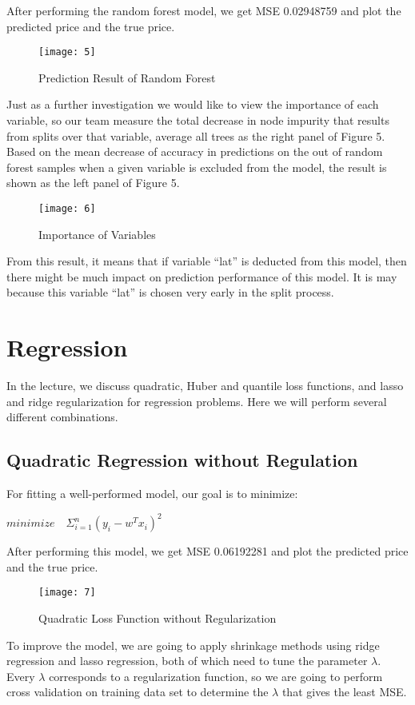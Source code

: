 \documentclass[12pt,twocolumn,twoside]{article}
\begin{document}
After performing the random forest model, we get MSE 0.02948759 and plot the predicted price and the true price.
\begin{figure}[h]
\texttt{[image: 5]}
\caption{Prediction Result of Random Forest}
\end{figure}
Just as a further investigation we would like to view the importance of each variable, so our team measure the total decrease in node impurity that results from splits over that variable, average all trees as the right panel of Figure 5. Based on the mean decrease of accuracy in predictions on the out of random forest samples when a given variable is excluded from the model, the result is shown as the left panel of Figure 5.
\begin{figure}[h]
\texttt{[image: 6]}
\caption{Importance of Variables}
\end{figure}
From this result, it means that if variable “lat” is deducted from this model, then there might be much impact on prediction performance of this model. It is may because this variable “lat” is chosen very early in the split process. 
\section{Regression}
In the lecture, we discuss quadratic, Huber and quantile loss functions, and lasso and ridge regularization for regression problems. Here we will perform several different combinations.

\subsection{Quadratic Regression without Regulation}
For fitting a well-performed model, our goal is to minimize:\\
\begin{center}
$minimize \quad \Sigma_{i=1}^n (y_i -w^T x_i)^2$
\end{center}
After performing this model, we get MSE 0.06192281
and plot the predicted price and the true price.
\begin{figure}[h]
\texttt{[image: 7]}
\caption{Quadratic Loss Function without Regularization}
\end{figure}
To improve the model, we are going to apply shrinkage methods using ridge regression and lasso regression, both of which need to tune the parameter $\lambda$. Every $\lambda$ corresponds to a regularization function, so we are going to perform cross validation on training data set to determine the $\lambda$ that gives the least MSE.
\end{document}
